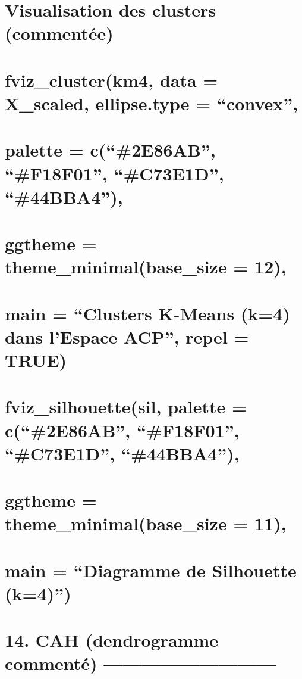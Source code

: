 \documentclass[
]{article}
\begin{document}
\section{Visualisation des clusters
(commentée)}\label{visualisation-des-clusters-commentuxe9e}

\section{fviz\_cluster(km4, data = X\_scaled, ellipse.type =
``convex'',}\label{fviz_clusterkm4-data-x_scaled-ellipse.type-convex}

\section{palette = c(``\#2E86AB'', ``\#F18F01'', ``\#C73E1D'',
``\#44BBA4''),}\label{palette-c2e86ab-f18f01-c73e1d-44bba4}

\section{ggtheme = theme\_minimal(base\_size =
12),}\label{ggtheme-theme_minimalbase_size-12}

\section{main = ``Clusters K-Means (k=4) dans l'Espace ACP'', repel =
TRUE)}\label{main-clusters-k-means-k4-dans-lespace-acp-repel-true}

\section{fviz\_silhouette(sil, palette = c(``\#2E86AB'', ``\#F18F01'',
``\#C73E1D'',
``\#44BBA4''),}\label{fviz_silhouettesil-palette-c2e86ab-f18f01-c73e1d-44bba4}

\section{ggtheme = theme\_minimal(base\_size =
11),}\label{ggtheme-theme_minimalbase_size-11}

\section{main = ``Diagramme de Silhouette
(k=4)'')}\label{main-diagramme-de-silhouette-k4}

\section{14. CAH (dendrogramme commenté)
---------------------------}\label{cah-dendrogramme-commentuxe9}
\end{document}
